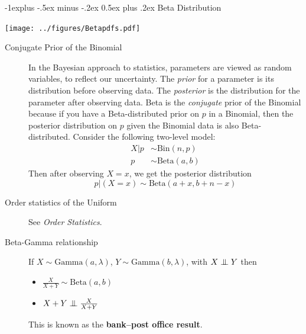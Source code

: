 \documentclass[10pt,landscape]{article}
\makeatletter
\newcommand\independent{\protect\mathpalette{\protect\independenT}{\perp}}
\def\independenT#1#2{\mathrel{\setbox0\hbox{$#1#2$}%
\copy0\kern-\wd0\mkern4mu\box0}}
\newcommand{\Bin}{\textrm{Bin}}
\newcommand{\Beta}{\textrm{Beta}}
\newcommand{\Gam}{\textrm{Gamma}}
\renewcommand{\subsection}{\@startsection{subsection}{2}{0mm}%
{-1explus -.5ex minus -.2ex}%
{0.5ex plus .2ex}%
{\normalfont\normalsize\bfseries}}
\makeatother
\begin{document}
\begin{multicols*}{3}
\begin{description}

        \end{description}

        \subsection{Beta Distribution}
        \begin{minipage}{\linewidth}
            \centering
            \texttt{[image: ../figures/Betapdfs.pdf]}
        \end{minipage}
        \medskip

        \begin{description}
            \item[Conjugate Prior of the Binomial] In the Bayesian approach to statistics, parameters are viewed as random variables, to reflect our uncertainty. The \emph{prior} for a parameter is its distribution before observing data. The \emph{posterior}  is the distribution for the parameter after observing data. Beta is the \emph{conjugate} prior of the Binomial because if you have a Beta-distributed prior on $p$ in a Binomial, then the posterior distribution on $p$ given the Binomial data is also Beta-distributed. Consider the following two-level model:
            \begin{align*}
                X|p & \sim \Bin(n, p)  \\
                p   & \sim \Beta(a, b)
            \end{align*}
            Then after observing  $X = x$, we get the posterior distribution
            \[p|(X=x) \sim \Beta(a + x, b + n - x) \]

            \item[Order statistics of the Uniform] See \emph{Order Statistics}.
            \item[Beta-Gamma relationship] If $X \sim \Gam(a, \lambda)$, $Y \sim \Gam(b, \lambda)$, with $X \independent Y$ then
            \begin{itemize}
                \item $\frac{X}{X + Y} \sim \Beta(a, b)$
                \item $X + Y \independent \frac{X}{X + Y}$
            \end{itemize}
            This is known as the \textbf{bank--post office result}.
        \end{description}


\end{multicols*}
\end{document}
